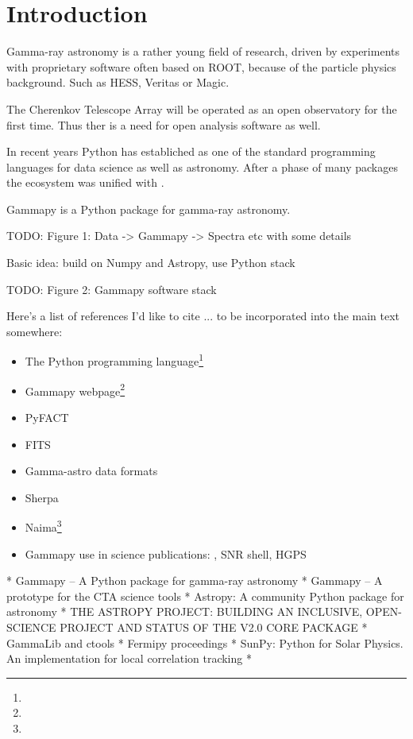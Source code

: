 \section{Introduction}
\label{sec:intro}

Gamma-ray astronomy is a rather young field of research, 
driven by experiments with proprietary software often based
on ROOT, because of the particle physics background. Such 
as HESS, Veritas or Magic.

The Cherenkov Telescope Array will be operated as an open
observatory for the first time. Thus ther is a need for
open analysis software as well.

In recent years Python has establiched as one of the standard 
programming languages for data science as well as astronomy.
After a phase of many packages the ecosystem was unified 
with \astropy \citep{astropy}.

Gammapy is a Python package for gamma-ray astronomy.



TODO: Figure 1: Data -> Gammapy -> Spectra etc with some details 

Basic idea: build on Numpy and Astropy, use Python stack

TODO: Figure 2: Gammapy software stack

Here's a list of references I'd like to cite ... to be incorporated into the
main text somewhere:

\begin{itemize}
\item The Python programming language\footnote{\PythonUrl}
\item Gammapy webpage\footnote{\GammapyUrl}
\item PyFACT \citep{pyfact}
\item FITS \citep{fits}
\item Gamma-astro data formats \cite{gadf-zenodo}
\item Sherpa \citep{sherpa-2011, sherpa-2009}
\item Naima\footnote{\NaimaUrl} \citep{Naima}
\item Gammapy use in science publications: \citep{Owen2015}, SNR shell, HGPS
\end{itemize}

* Gammapy – A Python package for gamma-ray astronomy
* Gammapy – A prototype for the CTA science tools 
* Astropy: A community Python package for astronomy
* THE ASTROPY PROJECT: BUILDING AN INCLUSIVE, OPEN-SCIENCE PROJECT AND STATUS OF THE V2.0 CORE PACKAGE
* GammaLib and ctools
* Fermipy proceedings
* SunPy: Python for Solar Physics. An implementation for local correlation tracking
*

